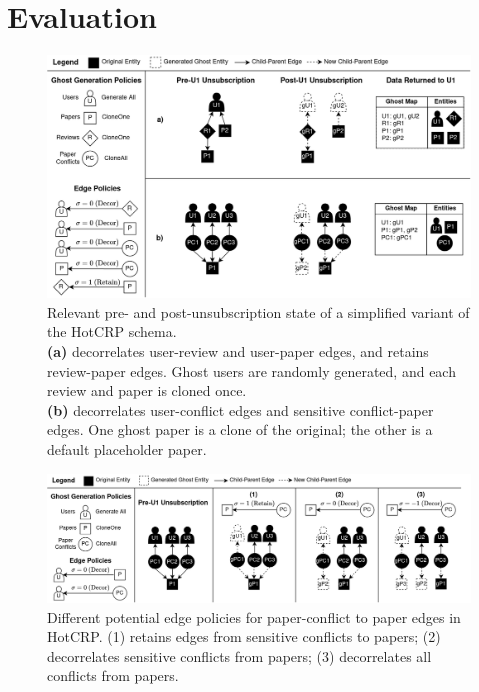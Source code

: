 \section{Evaluation}
\begin{figure}[t!]
    \centering
    \includegraphics[width=\textwidth]{img/decor_hotcrp}

    \caption{Relevant pre- and post-unsubscription state of a simplified variant of the HotCRP schema. \\ 
    \textbf{(a)} \sys decorrelates user-review and user-paper edges, and retains
    review-paper edges. Ghost users are randomly generated, and each review and paper is cloned once. \\
    \textbf{(b)} \sys decorrelates user-conflict edges and sensitive conflict-paper edges. One ghost
    paper is a clone of the original; the other is a default placeholder paper.
    }
    \label{fig:hotcrp}
\end{figure}

\begin{figure}[ht!]
    \centering
    \includegraphics[width=\textwidth]{img/pcs}

    \caption{Different potential edge policies for paper-conflict to paper edges in HotCRP.
    (1) retains edges from sensitive conflicts to papers; (2) decorrelates sensitive
    conflicts from papers; (3) decorrelates all conflicts from papers.}
    \label{fig:pcs}
\end{figure}


